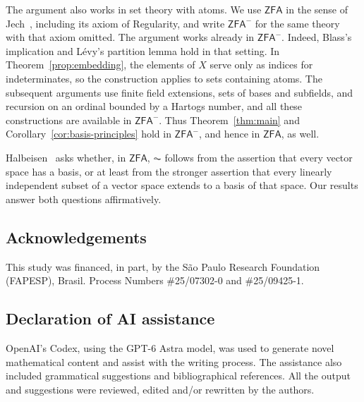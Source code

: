 The argument also works in set theory with atoms. We use
$\mathsf{ZFA}$ in the sense of Jech~\cite[\S4.1, pp.~44--45]{Jech1973},
including its axiom of Regularity, and write $\mathsf{ZFA}^{-}$ for
the same theory with that axiom omitted. The argument works already
in $\mathsf{ZFA}^{-}$.
Indeed, Blass's implication and L\'evy's partition lemma hold in that
setting. In Theorem~\ref{prop:embedding}, the elements of $X$
serve only as indices for indeterminates, so the construction applies
to sets containing atoms. The subsequent arguments use finite
field extensions, sets of bases and subfields, and recursion on an
ordinal bounded by a Hartogs number, and all these constructions are
available in $\mathsf{ZFA}^{-}$.
Thus Theorem~\ref{thm:main} and
Corollary~\ref{cor:basis-principles} hold in $\mathsf{ZFA}^{-}$, and hence in $\mathsf{ZFA}$, as well.

Halbeisen~\cite[Note~94]{Halbeisen2012} asks whether, in $\mathsf{ZFA}$,
$\AC$ follows from the assertion that every vector space has a basis,
or at least from the stronger assertion that every linearly independent
subset of a vector space extends to a basis of that space. Our results
answer both questions affirmatively.

\subsection*{Acknowledgements}
This study was financed, in part, by the S\~ao Paulo Research Foundation
(FAPESP), Brasil. Process Numbers \#25/07302-0 and \#25/09425-1.

\subsection*{Declaration of AI assistance}
OpenAI's Codex, using the GPT-6 Astra model,
was used to generate novel mathematical content and assist with the writing process.
The assistance also included grammatical suggestions and bibliographical references.
All the output and suggestions were reviewed, edited and/or rewritten by the authors.
